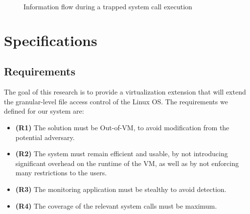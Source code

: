 \begin{figure}[ht]
	\centering
	
	\caption{Information flow during a trapped system call execution}
	\label{fig:overview}
\end{figure}


\section{Specifications}\label{sec:specs}



\subsection{Requirements}\label{sub:requirements}
The goal of this research is to provide a virtualization extension that will extend the granular-level file access control of the Linux \ac{OS}. The requirements we defined for our system are:
\begin{itemize}
	\item \textbf{(R1)} The solution must be Out-of-VM, to avoid modification from the potential adversary. 
	\item \textbf{(R2)} The system must remain efficient and usable, by not introducing significant overhead on the runtime of the \ac{VM}, as well as by not enforcing many restrictions to the users. 
	\item \textbf{(R3)} The monitoring application must be stealthy to avoid detection.
	\item \textbf{(R4)} The coverage of the relevant system calls must be maximum.
\end{itemize}

